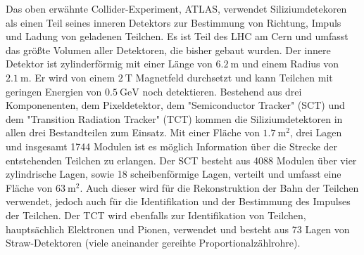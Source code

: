 Das oben erwähnte Collider-Experiment, ATLAS, verwendet Siliziumdetekoren als
einen Teil seines inneren Detektors zur Bestimmung von Richtung, Impuls
und Ladung von geladenen Teilchen. Es ist Teil des LHC am Cern und umfasst
das größte Volumen aller Detektoren, die bisher gebaut wurden\cite{atlas}.
Der innere Detektor ist zylinderförmig mit einer Länge von $\SI{6.2}{\meter}$ und
einem Radius von $\SI{2.1}{\meter}$. Er wird von einem $\SI{2}{\tesla}$ Magnetfeld
durchsetzt und kann Teilchen mit geringen Energien von $\SI{0.5}{\giga\eV}$ noch detektieren.
Bestehend aus drei Komponenenten, dem Pixeldetektor, dem "Semiconductor Tracker" (SCT) und dem "Transition Radiation Tracker" (TCT) kommen  die
Siliziumdetektoren in allen drei Bestandteilen zum Einsatz.
Mit einer Fläche von $\SI{1.7}{\meter\squared}$, drei Lagen und insgesamt 1744 Modulen ist es möglich
Information über die Strecke der entstehenden Teilchen zu erlangen. Der SCT besteht aus 4088 Modulen über vier zylindrische Lagen,
sowie 18 scheibenförmige Lagen, verteilt und umfasst eine Fläche von $\SI{63}{\meter\squared}$. Auch dieser wird für
die Rekonstruktion der Bahn der Teilchen verwendet, jedoch auch für die Identifikation und der Bestimmung des Impulses der Teilchen.
Der TCT wird ebenfalls zur Identifikation von Teilchen, hauptsächlich Elektronen und Pionen, verwendet und besteht aus 73 Lagen
von Straw-Detektoren (viele aneinander gereihte Proportionalzählrohre).
